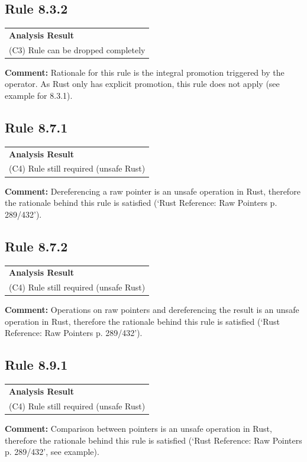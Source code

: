 \subsection*{Rule 8.3.2}
\begin{longtable}{p{13cm}}
\textbf{Analysis Result} \\
(C3) Rule can be dropped completely \\
\end{longtable}
\textbf{Comment:} Rationale for this rule is the integral promotion triggered by the operator. As Rust only has explicit promotion, this rule does not apply (see example for 8.3.1). \\
\subsection*{Rule 8.7.1}
\begin{longtable}{p{13cm}}
\textbf{Analysis Result} \\
(C4) Rule still required (unsafe Rust) \\
\end{longtable}
\textbf{Comment:}  Dereferencing a raw pointer is an unsafe operation in Rust, therefore the rationale behind this rule is satisfied (`Rust Reference: Raw Pointers p. 289/432'). \\
\subsection*{Rule 8.7.2}
\begin{longtable}{p{13cm}}
\textbf{Analysis Result} \\
(C4) Rule still required (unsafe Rust) \\
\end{longtable}
\textbf{Comment:} Operations on raw pointers and dereferencing the result is an unsafe operation in Rust, therefore the rationale behind this rule is satisfied (`Rust Reference: Raw Pointers p. 289/432'). \\
\subsection*{Rule 8.9.1}
\begin{longtable}{p{13cm}}
\textbf{Analysis Result} \\
(C4) Rule still required (unsafe Rust) \\
\end{longtable}
\textbf{Comment:} Comparison between pointers is an unsafe operation in Rust, therefore the rationale behind this rule is satisfied (`Rust Reference: Raw Pointers p. 289/432', see example). \\


